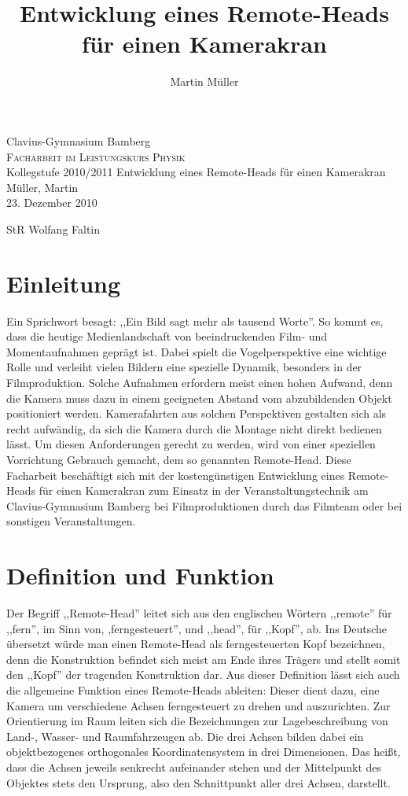 \documentclass[a4paper, 12pt, bibtotocnumbered, liststotocnumbered]{scrartcl}
\begin{document}
	\title{Entwicklung eines Remote-Heads für einen Kamerakran}
	\author{Martin Müller}

	\thispagestyle{empty}
	\begin{center}
		\large{Clavius-Gymnasium Bamberg}\\
		\Large\textsc{Facharbeit im Leistungskurs Physik}\\
		\large{Kollegstufe 2010/2011}
		\vfill
		{\Huge Entwicklung eines Remote-Heads für einen Kamerakran}
		\vfill
		\hfill{Müller, Martin}\\
		\hfill\small{23. Dezember 2010}\\
	\end{center}
	StR Wolfang Faltin

	\pagebreak

	\thispagestyle{empty}
	\tableofcontents

	\pagebreak

	\section{Einleitung}
	Ein Sprichwort besagt: ,,Ein Bild sagt mehr als tausend Worte”. So kommt es, dass die heutige Medienlandschaft von beeindruckenden Film- und Momentaufnahmen geprägt ist. Dabei spielt die Vogelperspektive eine wichtige Rolle und verleiht vielen Bildern eine spezielle Dynamik, besonders in der Filmproduktion. Solche Aufnahmen erfordern meist einen hohen Aufwand, denn die Kamera muss dazu in einem geeigneten Abstand vom abzubildenden Objekt positioniert werden. Kamerafahrten aus solchen Perspektiven gestalten sich als recht aufwändig, da sich die Kamera durch die Montage nicht direkt bedienen lässt. Um diesen Anforderungen gerecht zu werden, wird von einer speziellen Vorrichtung Gebrauch gemacht, dem so genannten Remote-Head.
	Diese Facharbeit beschäftigt sich mit der kostengünstigen Entwicklung eines Remote-Heads für einen Kamerakran zum Einsatz in der Veranstaltungstechnik am Clavius-Gymnasium Bamberg bei Filmproduktionen durch das Filmteam oder bei sonstigen Veranstaltungen.

	\section{Definition und Funktion}
	Der Begriff ,,Remote-Head” leitet sich aus den englischen Wörtern ,,remote” für ,,fern”, im Sinn von, ,ferngesteuert”, und ,,head”, für ,,Kopf”, ab. Ins Deutsche übersetzt würde man einen Remote-Head als ferngesteuerten Kopf bezeichnen, denn die Konstruktion befindet sich meist am Ende ihres Trägers und stellt somit den ,,Kopf” der tragenden Konstruktion dar.
	Aus dieser Definition lässt sich auch die allgemeine Funktion eines Remote-Heads ableiten: Dieser dient dazu, eine Kamera um verschiedene Achsen ferngesteuert zu drehen und auszurichten. Zur Orientierung im Raum leiten sich die Bezeichnungen zur Lagebeschreibung von Land-, Wasser- und Raumfahrzeugen ab. Die drei Achsen bilden dabei ein objektbezogenes orthogonales Koordinatensystem in drei Dimensionen. Das heißt, dass die Achsen jeweils senkrecht aufeinander stehen und der Mittelpunkt des Objektes stets den Ursprung, also den Schnittpunkt aller drei Achsen, darstellt.
\end{document}
